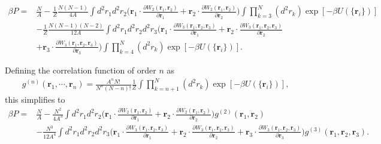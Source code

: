 \documentclass[../main.tex]{subfiles}
\begin{document}
\begin{widetext}
  \begin{align}
    \beta P
    =& \frac{N}{A}
    -\frac{1}{Z}\frac{N(N-1)}{4A}\int d^2r_1d^2r_2\bigg(\bm{r}_1\cdot
    \frac{\partial W_2(\bm{r}_1,\bm{r}_2)}{\partial \bm{r}_1}
    +\bm{r}_2\cdot
    \frac{\partial W_2(\bm{r}_1,\bm{r}_2)}{\partial \bm{r}_2}\bigg)
    \int\prod_{k=3}^N(d^2r_k)
    \exp[-\beta U(\{\bm{r}_i\})]\nonumber\\
    &-\frac{1}{Z}\frac{N(N-1)(N-2)}{12A}\int d^2r_1d^2r_2d^2r_3\bigg(
    \bm{r}_1\cdot
    \frac{\partial W_3(\bm{r}_1,\bm{r}_2,\bm{r}_3)}{\partial \bm{r}_1}
    +\bm{r}_2\cdot
    \frac{\partial W_3(\bm{r}_1,\bm{r}_2,\bm{r}_3)}{\partial \bm{r}_2}
    \nonumber\\
    &+\bm{r}_3\cdot
    \frac{\partial W_3(\bm{r}_1,\bm{r}_2,\bm{r}_3)}{\partial \bm{r}_3}
    \bigg)
    \int\prod_{k=4}^N(d^2r_k)
    \exp[-\beta U(\{\bm{r}_i\})].
  \end{align}

  Defining the correlation function of order $n$ as
  \begin{align}
    g^{(n)}(\bm{r}_1,\cdots,\bm{r}_n)=\frac{A^nN!}{N^n(N-n)!}
    \frac{1}{Z}\int\prod_{k=n+1}^N(d^2r_k)
    \exp[-\beta U(\{\bm{r}_i\})],
  \end{align}
  this simplifies to
  \begin{align}\label{appeq:p_2_and_3}
    \beta P
    =& \frac{N}{A}
    -\frac{N^2}{4A^3}\int d^2r_1d^2r_2\bigg(\bm{r}_1\cdot
    \frac{\partial W_2(\bm{r}_1,\bm{r}_2)}{\partial \bm{r}_1}
    +\bm{r}_2\cdot
    \frac{\partial W_2(\bm{r}_1,\bm{r}_2)}{\partial \bm{r}_2}\bigg)
    g^{(2)}(\bm{r}_1,\bm{r}_2)\nonumber\\
    &-\frac{N^3}{12A^4}\int d^2r_1d^2r_2d^2r_3\bigg(
    \bm{r}_1\cdot
    \frac{\partial W_3(\bm{r}_1,\bm{r}_2,\bm{r}_3)}{\partial \bm{r}_1}
    +\bm{r}_2\cdot
    \frac{\partial W_3(\bm{r}_1,\bm{r}_2,\bm{r}_3)}{\partial \bm{r}_2}
    +\bm{r}_3\cdot
    \frac{\partial W_3(\bm{r}_1,\bm{r}_2,\bm{r}_3)}{\partial \bm{r}_3}
    \bigg)g^{(3)}(\bm{r}_1,\bm{r}_2,\bm{r}_3).
  \end{align}
\end{widetext}
\end{document}
